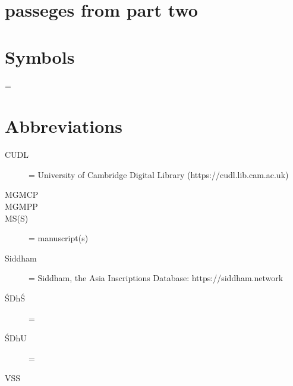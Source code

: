 \documentclass[11pt]{book}
\begin{document}

\thispagestyle{empty}

\section{passeges from part two}

\vfill
\pagebreak







\thispagestyle{empty}

\section{Symbols}

\begin{description}

\item[\similar]

\item[\compare]

\item[ = ]

\end{description}


\section{Abbreviations}

\begin{description}

\item[CUDL] = University of Cambridge Digital Library  
  (https://cudl.lib.cam.ac.uk)
  
\item[\fol]

\item[\fols]

\item[MGMCP]

\item[MGMPP]

\item[MS(S)] = manuscript(s)

\item[Siddham] = Siddham, the Asia Inscriptions Database:
https://siddham.network 

\item[ŚDhŚ] = \SDhS

\item[ŚDhU] = \SDhU
  
\item[VSS] 
  
\end{description}
\end{document}
